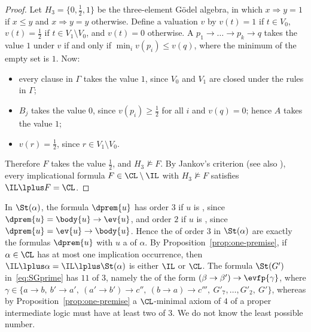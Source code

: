\begin{proof}
Let $H_3=\{0,\tfrac12,1\}$ be the three-element Gödel algebra, in which
$x\Rightarrow y=1$ if $x\le y$ and $x\Rightarrow y=y$ otherwise. Define a
valuation $v$ by $v(t)=1$ if $t\in V_0$, $v(t)=\tfrac12$ if
$t\in V_1\setminus V_0$, and $v(t)=0$ otherwise. A 
$p_1\to\dots\to p_k\to q$ takes the value $1$ under $v$ if and only if
$\min_i v(p_i)\le v(q)$, where the minimum of the empty set is $1$. Now:
\begin{itemize}
\item every clause in $\Gamma$ takes the value $1$, since $V_0$ and $V_1$
  are closed under the rules in $\Gamma$;
\item $B_j$ takes the value $0$, since $v(p_i)\ge\tfrac12$ for all $i$ and
  $v(q)=0$; hence $A$ takes the value $1$;
\item $v(r)=\tfrac12$, since $r\in V_1\setminus V_0$.
\end{itemize}
Therefore $F$ takes the value $\tfrac12$, and $H_3\not\models F$. By
Jankov's criterion \cite[Theorem~1]{Jan68} (see also
\cite[Sect.~3.2]{NM21}), every implicational formula
$F\in\CL\setminus\IL$ with $H_3\not\models F$ satisfies $\IL\lplus F=\CL$.
\end{proof}

\begin{remark}\label{rem:many}
In $\St(\alpha)$, the formula $\dprem{u}$ has order $3$ if $u$ is
, since $\dprem{u}=\body{u}\to\ev{u}$, and order $2$ if $u$ is
, since $\dprem{u}=\ev{u}\to \body{u}$. Hence the
 of order $3$ in $\St(\alpha)$ are exactly the formulas
$\dprem{u}$ with $u$ a   of $\alpha$. By
Proposition~\ref{prop:one-premise}, if $\alpha\in\CL$ has at most one
 implication occurrence, then $\IL\lplus \alpha=\IL\lplus \St(\alpha)$ is
either $\IL$ or $\CL$. The formula $\St(G')$ in~\eqref{eq:SGprime} has $11$ 
of  $3$, namely the  of the form
$(\beta\to\beta')\to\evfp{\gamma}$, where
$\gamma\in\{a\to b,\ b'\to a',\ (a'\to b')\to c'',\ (b\to a)\to c''',\
G'_7,\dots,G'_2,\ G'\}$,
whereas by Proposition~\ref{prop:one-premise} a $\CL$-minimal axiom of
 $4$ of a proper intermediate logic must have at least two
\kl{antecedents} of \kl{order} $3$. We do not know the least
possible number.
\end{remark}
